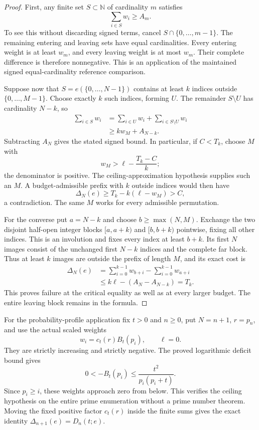 \documentclass[11pt]{article}
\theoremstyle{definition}
\begin{document}
\begin{proof}
First, any finite set $S\subset\mathbb N$ of cardinality $m$
satisfies
\[
 \sum_{i\in S}w_i\ge A_m.
\]
To see this without discarding signed terms, cancel
$S\cap\{0,\ldots,m-1\}$. The remaining entering and leaving sets
have equal cardinalities. Every entering weight is at least $w_m$,
and every leaving weight is at most $w_m$. Their complete
difference is therefore nonnegative. This is an application of
the maintained signed equal-cardinality reference comparison.

Suppose now that $S=e(\{0,\ldots,N-1\})$ contains at least $k$
indices outside $\{0,\ldots,M-1\}$. Choose exactly $k$ such
indices, forming $U$. The remainder $S\setminus U$ has
cardinality $N-k$, so
\[
 \begin{split}
 \sum_{i\in S}w_i
  &=\sum_{i\in U}w_i+\sum_{i\in S\setminus U}w_i\\
  &\ge k w_M+A_{N-k}.
 \end{split}
\]
Subtracting $A_N$ gives the stated signed bound. In particular,
if $C<T_k$, choose $M$ with
\[
 w_M>\ell-\frac{T_k-C}{k};
\]
the denominator is positive. The ceiling-approximation hypothesis
supplies such an $M$. A budget-admissible prefix with $k$ outside
indices would then have
\[
 \Delta_N(e)\ge T_k-k(\ell-w_M)>C,
\]
a contradiction. The same $M$ works for every admissible
permutation.

For the converse put $a=N-k$ and choose
$b\ge\max(N,M)$. Exchange the two disjoint half-open integer
blocks $[a,a+k)$ and $[b,b+k)$ pointwise, fixing all other indices.
This is an involution and fixes every index at least $b+k$.
Its first $N$ images consist of the unchanged first $N-k$
indices and the complete far block. Thus at least $k$ images
are outside the prefix of length $M$, and its exact cost is
\[
 \begin{split}
 \Delta_N(e)
  &=\sum_{i=0}^{k-1}w_{b+i}-\sum_{i=0}^{k-1}w_{a+i}\\
  &\le k\ell-(A_N-A_{N-k})=T_k.
 \end{split}
\]
This proves failure at the critical equality as well as at every
larger budget. The entire leaving block remains in the formula.
\end{proof}

For the probability-profile application fix $t>0$ and $n\ge0$,
put $N=n+1$, $r=p_n$, and use the actual scaled weights
\[
 w_i=c_t(r)B_t(p_i),\qquad \ell=0.
\]
They are strictly increasing and strictly negative. The proved
logarithmic deficit bound gives
\[
 0<-B_t(p_i)\le\frac{t^2}{p_i(p_i+t)}.
\]
Since $p_i\ge i$, these weights approach zero from below.
This verifies the ceiling hypothesis on the entire prime
enumeration without a prime number theorem. Moving the fixed
positive factor $c_t(r)$ inside the finite sums gives the exact
identity $\Delta_{n+1}(e)=D_n(t;e)$.
\end{document}
